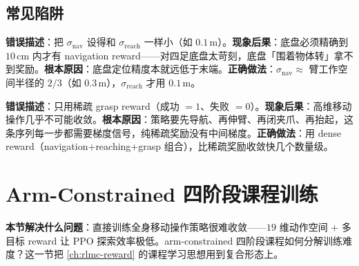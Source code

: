 \subsection{常见陷阱}
\label{sec:rlmc-lm-reward-pitfalls}

\begin{pitfall}
\textbf{错误描述}：把 $\sigma_{\text{nav}}$ 设得和 $\sigma_{\text{reach}}$ 一样小（如 $0.1\,$m）。\textbf{现象后果}：底盘必须精确到 $10\,$cm 内才有 navigation reward——对四足底盘太苛刻，底盘「围着物体转」拿不到奖励。\textbf{根本原因}：底盘定位精度本就远低于末端。\textbf{正确做法}：$\sigma_{\text{nav}}\approx$ 臂工作空间半径的 $2/3$（如 $0.3\,$m），$\sigma_{\text{reach}}$ 才用 $0.1\,$m。
\end{pitfall}

\begin{pitfall}
\textbf{错误描述}：只用稀疏 grasp reward（成功 $=1$、失败 $=0$）。\textbf{现象后果}：高维移动操作几乎不可能收敛。\textbf{根本原因}：策略要先导航、再伸臂、再闭夹爪、再抬起，这条序列每一步都需要梯度信号，纯稀疏奖励没有中间梯度。\textbf{正确做法}：用 dense reward（navigation+reaching+grasp 组合），比稀疏奖励收敛快几个数量级。
\end{pitfall}

\begin{practice}[练习·多目标奖励]
\end{practice}

\section{Arm-Constrained 四阶段课程训练}
\label{sec:rlmc-lm-curriculum}

\textbf{本节解决什么问题}：直接训练全身移动操作策略很难收敛——$19$ 维动作空间 + 多目标 reward 让 PPO 探索效率极低。arm-constrained 四阶段课程如何分解训练难度？这一节把 \cref{ch:rlmc-reward} 的课程学习思想用到复合形态上。

